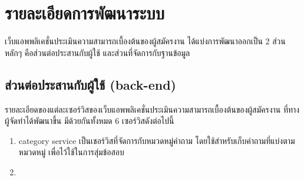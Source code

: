 \section{รายละเอียดการพัฒนาระบบ}

เว็บแอพพลิเคชั่นประเมินความสามารถเบื้องต้นของผู้สมัครงาน ได้แบ่งการพัฒนาออกเป็น 2 ส่วนหลักๆ คือส่วนต่อประสานกับผู้ใช้ และส่วนที่จัดการกับฐานข้อมูล

\subsection{ส่วนต่อประสานกับผู้ใช้ (back-end)}

รายละเอียดของแต่ละเซอร์วิสของเว็บแอพพลิเคชั่นประเมินความสามารถเบื้องต้นของผู้สมัครงาน ที่ทางผู้จัดทำได้พัฒนาขึ้น มีด้วยกันทั้งหมด 6 เซอร์วิสดังต่อไปนี้

\begin{enumerate}
  \item category service เป็นเชอร์วิสที่จัดการกับหมวดหมู่คำถาม โดยใช้สำหรับเก็บคำถามที่แบ่งตามหมวดหมู่ เพื่อไว้ใช้ในการสุ่มข้อสอบ
  \item 
\end{enumerate}